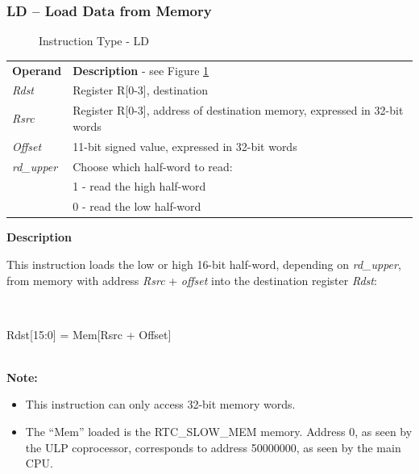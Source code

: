 \documentclass[main\_\_EN.tex]{subfiles}
\begin{document}
\subsubsection{LD – Load Data from Memory}

%
%
%
%
%
%
%
\begin{figure}[!ht]
    \centering
    \caption{Instruction Type - LD}
    \label{figure:LD}
\end{figure}

\begin{tabular}{ l l }
\textbf{Operand} & \textbf{Description} - see Figure  \ref{figure:LD} \\
\textit{Rdst} & Register R[0-3], destination \\
\textit{Rsrc} &Register R[0-3], address of destination memory, expressed in 32-bit words \\
\textit{Offset} & 11-bit signed value, expressed in 32-bit words\\
\textit{rd\_upper} & Choose which half-word to read: \\
 & 1 - read the high half-word\\
 & 0 - read the low half-word \\

\end{tabular}

\textbf{Description}

This instruction loads the low or high 16-bit half-word, depending on \textit{rd\_upper}, from memory with address \textit{Rsrc} + \textit{offset} into the destination register \textit{Rdst}:

~
\begin{centering}
    Rdst[15:0] = Mem[Rsrc + Offset]\\
\end{centering}
~\\

\textbf{Note:}
\begin{itemize}
    \item This instruction can only access 32-bit memory words.
    \item The “Mem” loaded is the RTC\_SLOW\_MEM memory. Address 0, as seen by the ULP coprocessor, corresponds to address \hexprefix{}50000000, as seen by the main CPU.
\end{itemize}
\end{document}

